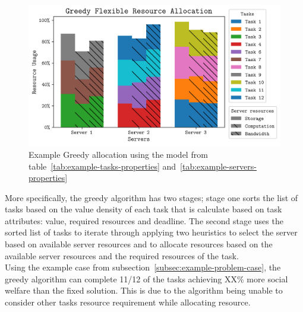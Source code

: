 \begin{figure}
    \centering
    \includegraphics[width=\linewidth]{figs/allocation/greedy_flexible_resource_allocation.png}
    \caption{Example Greedy allocation using the model from table~\ref{tab:example-tasks-properties}
    and~\ref{tab:example-servers-properties}}
    \label{fig:example-greedy-allocation}
\end{figure}

More specifically, the greedy algorithm has two stages; stage one sorts the list of tasks based on the value
density of each task that is calculate based on task attributes: value, required resources and deadline. The second
stage uses the sorted list of tasks to iterate through applying two heuristics to select the server based on
available server resources and to allocate resources based on the available server resources and the required resources
of the task. \\
Using the example case from subsection~\ref{subsec:example-problem-case}, the greedy algorithm can complete 11/12 of
the tasks achieving XX\% more social welfare than the fixed solution. This is due to the algorithm being unable to %
consider other tasks resource requirement while allocating resource. %

